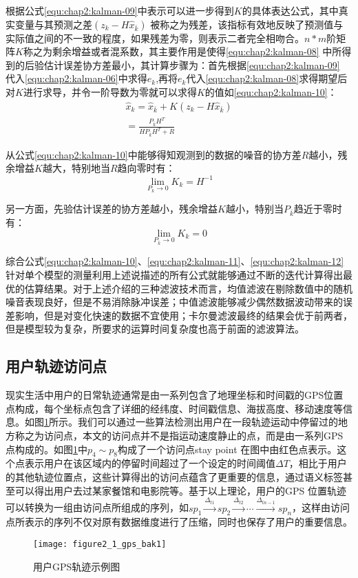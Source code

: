 \par 根据公式\ref{equ:chap2:kalman-09}中表示可以进一步得到$K$的具体表达公式，其中真实变量与其预测之差$(z_{k}-H\hat{x}_{\bar{k}})$ 被称之为残差，该指标有效地反映了预测值与实际值之间的不一致的程度，如果残差为零，则表示二者完全相吻合。$n*m$阶矩阵$K$称之为剩余增益或者混系数，其主要作用是使得\ref{equ:chap2:kalman-08} 中所得到的后验估计误差协方差最小，其计算步骤为：首先根据\ref{equ:chap2:kalman-09} 代入\ref{equ:chap2:kalman-06}中求得$e_{k}$,再将$e_{k}$代入\ref{equ:chap2:kalman-08}求得期望后对$K$进行求导，并令一阶导数为零就可以求得$K$的值如\ref{equ:chap2:kalman-10}：
\begin{align}
\label{equ:chap2:kalman-10}
\hat{x}_{k}=\hat{x}_{\bar{k}} + K(z_{k}-H\hat{x}_{\bar{k}})
\nonumber \\
=\frac{P_{\bar{k}}H^{T}}{HP_{\bar{k}}H^{T}+R}
\end{align}
\par 从公式\ref{equ:chap2:kalman-10}中能够得知观测到的数据的噪音的协方差$R$越小，残余增益$K$越大，特别地当$R$趋向零时有：
\begin{equation}
\label{equ:chap2:kalman-11}
\lim_{P_{k} \to 0 }K_{k}=H^{-1}
\end{equation}
\par 另一方面，先验估计误差的协方差越小，残余增益$K$越小，特别当$P_{\bar{k}}$趋近于零时有：
\begin{equation}
\label{equ:chap2:kalman-12}
\lim_{P_{\bar{k}} \to 0 }K_{k}=0
\end{equation}
\par 综合公式\ref{equ:chap2:kalman-10}、\ref{equ:chap2:kalman-11}、\ref{equ:chap2:kalman-12}针对单个模型的测量利用上述说描述的所有公式就能够通过不断的迭代计算得出最优的估算结果。对于上述介绍的三种滤波技术而言，均值滤波在剔除数值中的随机噪音表现良好，但是不易消除脉冲误差；中值滤波能够减少偶然数据波动带来的误差影响，但是对变化快速的数据不宜使用；卡尔曼滤波最终的结果会优于前两者，但是模型较为复杂，所要求的运算时间复杂度也高于前面的滤波算法。
\subsection{用户轨迹访问点}
现实生活中用户的日常轨迹通常是由一系列包含了地理坐标和时间戳的GPS位置点构成，每个坐标点包含了详细的经纬度、时间戳信息、海拔高度、移动速度等信息。如图\ref{fig:2_1}所示。我们可以通过一些算法检测出用户在一段轨迹运动中停留过的地方称之为访问点，本文的访问点并不是指运动速度静止的点，而是由一系列GPS点构成的。如图\ref{fig:2_1}中$p_{4} \sim p_{8}$构成了一个访问点stay point 在图中由红色点表示。这个点表示用户在该区域内的停留时间超过了一个设定的时间阈值$\Delta T$，相比于用户的其他轨迹位置点，这些计算得出的访问点蕴含了更重要的信息，通过语义标签甚至可以得出用户去过某家餐馆和电影院等。基于以上理论，用户的GPS 位置轨迹可以转换为一组由访问点所组成的序列，如$sp_{1}\overset{\Delta_{t1}}{\rightarrow} sp_{2}\overset{\Delta_{t2}}{\rightarrow}\cdots \overset{\Delta_{tn-1}}{\rightarrow}sp_{n}$，这样由访问点所表示的序列不仅对原有数据维度进行了压缩，同时也保存了用户的重要信息。
\begin{figure}[H]
\centering
\texttt{[image: figure2\_1\_gps\_bak1]}
\caption{用户GPS轨迹示例图}
\label{fig:2_1}
\end{figure}
